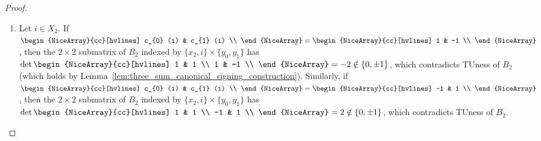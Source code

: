 \documentclass{article}
\theoremstyle{definition}
\begin{document}
\begin{proof}
    \begin{enumerate}
        \item Let $i \in X_{2}$. If $\begin{NiceArray}{cc}[hvlines] c_{0} (i) & c_{1} (i) \\ \end{NiceArray} = \begin{NiceArray}{cc}[hvlines] 1 & -1 \\ \end{NiceArray}$, then the $2 \times 2$ submatrix of $B_{2}$ indexed by $\{x_{2}, i\} \times \{y_{0}, y_{1}\}$ has $\det \begin{NiceArray}{cc}[hvlines] 1 & 1 \\ 1 & -1 \\ \end{NiceArray} = -2 \notin \{0, \pm 1\}$, which contradicts TUness of $B_{2}$ (which holds by Lemma~\ref{lem:three_sum_canonical_signing_construction}). Similarly, if $\begin{NiceArray}{cc}[hvlines] c_{0} (i) & c_{1} (i) \\ \end{NiceArray} = \begin{NiceArray}{cc}[hvlines] -1 & 1 \\ \end{NiceArray} $, then the $2 \times 2$ submatrix of $B_{2}$ indexed by $\{x_{2}, i\} \times \{y_{0}, y_{1}\}$ has $\det \begin{NiceArray}{cc}[hvlines] 1 & 1 \\ -1 & 1 \\ \end{NiceArray} = 2 \notin \{0, \pm 1\}$, which contradicts TUness of $B_{2}$.



\end{enumerate}
\end{proof}
\end{document}
